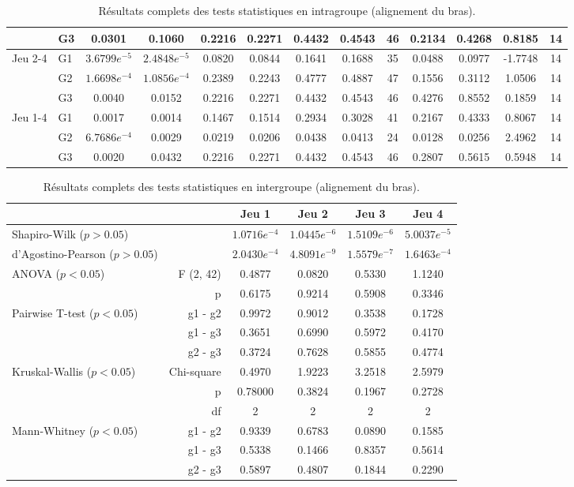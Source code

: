 {\begin{landscape}
\begin{table}[H]
\begin{tabular}{ll|cc|ccccc|cccc}
 & G3 & 0.0301 & 0.1060 & 0.2216 & 0.2271 & 0.4432 & 0.4543 & 46 & 0.2134 & 0.4268 & 0.8185 & 14 \\\hline
\multirow{3}{*}{Jeu 2-4} & G1 & $3.6799e^{-5}$ & $2.4848e^{-5}$ & 0.0820 & 0.0844 & 0.1641 & 0.1688 & 35 & 0.0488 & 0.0977 & -1.7748 & 14 \\
 & G2 & $1.6698e^{-4}$ & $1.0856e^{-4}$ & 0.2389 & 0.2243 & 0.4777 & 0.4887 & 47 & 0.1556 & 0.3112 & 1.0506 & 14 \\
 & G3 & 0.0040 & 0.0152 & 0.2216 & 0.2271 & 0.4432 & 0.4543 & 46 & 0.4276 & 0.8552 & 0.1859 & 14 \\\hline
\multirow{3}{*}{Jeu 1-4} & G1 & 0.0017 & 0.0014 & 0.1467 & 0.1514 & 0.2934 & 0.3028 & 41 & 0.2167 & 0.4333 & 0.8067 & 14 \\
 & G2 & $6.7686e^{-4}$ & 0.0029 & 0.0219 & 0.0206 & 0.0438 & 0.0413 & 24 & 0.0128 & 0.0256 & 2.4962 & 14 \\
 & G3 & 0.0020 & 0.0432 & 0.2216 & 0.2271 & 0.4432 & 0.4543 & 46 & 0.2807 & 0.5615 & 0.5948 & 14
\end{tabular}
\caption{Résultats complets des tests statistiques en intragroupe (alignement du bras).}
\end{table}
\end{landscape}}

\begin{table}[H]
\begin{tabular}{lr|cccc}
& & Jeu 1 & Jeu 2 & Jeu 3 & Jeu 4 \\\hline
Shapiro-Wilk ($p > 0.05$) & & $1.0716e^{-4}$ & $1.0445e^{-6}$ & $1.5109e^{-6}$ & $5.0037e^{-5}$ \\
d'Agostino-Pearson ($p > 0.05$) & & $2.0430e^{-4}$ & $4.8091e^{-9}$ & $1.5579e^{-7}$ & $1.6463e^{-4}$ \\\hline
\multirow{2}{*}{ANOVA ($p < 0.05$)} & F (2, 42) & 0.4877 & 0.0820 & 0.5330 & 1.1240 \\
 & p & 0.6175 & 0.9214 & 0.5908 & 0.3346 \\\hline
\multirow{3}{*}{Pairwise T-test ($p < 0.05$)} & g1 - g2 & 0.9972 & 0.9012 & 0.3538 & 0.1728 \\
 & g1 - g3 & 0.3651 & 0.6990 & 0.5972 & 0.4170 \\
 & g2 - g3 & 0.3724 & 0.7628 & 0.5855 & 0.4774 \\\hline
\multirow{3}{*}{Kruskal-Wallis ($p < 0.05$)} & Chi-square & 0.4970 & 1.9223 & 3.2518 & 2.5979 \\
 & p & 0.78000 & 0.3824 & 0.1967 & 0.2728 \\
 & df & 2 & 2 & 2 & 2 \\\hline
\multirow{3}{*}{Mann-Whitney ($p < 0.05$)} & g1 - g2 & 0.9339 & 0.6783 & 0.0890 & 0.1585 \\
 & g1 - g3 & 0.5338 & 0.1466 & 0.8357 & 0.5614 \\
 & g2 - g3 & 0.5897 & 0.4807 & 0.1844 & 0.2290
\end{tabular}
\caption{Résultats complets des tests statistiques en intergroupe (alignement du bras).}
\end{table}

